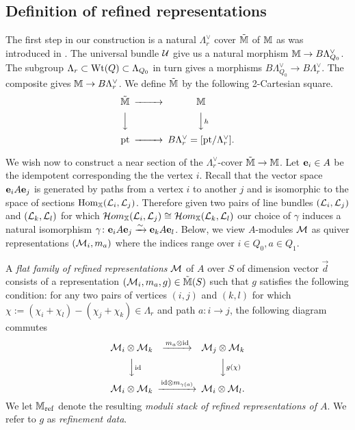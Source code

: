 \documentclass[12pt]{amsart}
\newcommand{\Wt}{\textup{Wt}}
\begin{document}
\subsection{Definition of refined representations}
The first step in our construction is a natural $\Lambda_r^\vee$ cover $\tilde{\mathbb{M}}$ of $\mathbb{M}$ as was introduced in \cite{Abd}.
The universal bundle $\mathcal{U}$ give us a natural morphism $\mathbb{M} \rightarrow B\Lambda_{Q_0}^\vee$.
The subgroup $\Lambda_r \subset \Wt(Q) \subset \Lambda_{Q_0}$ in turn gives a morphisms $B\Lambda_{Q_0}^\vee \rightarrow B\Lambda_r^\vee$.
The composite gives $\mathbb{M} \rightarrow B\Lambda_r^\vee$.
We define $\tilde{\mathbb{M}}$ by the following 2-Cartesian square.
\begin{equation*}
\begin{CD}
\tilde{\bM} @>>> \bM \\
@VVV @VVhV \\
\text{pt} @>>> B\Lambda_r^{\vee} = [\text{pt}/\Lambda_r^{\vee}].
\end{CD}
\end{equation*}

We wish now to construct a near section of the $\Lambda_r^{\vee}$-cover $\tilde{\mathbb{M}} \rightarrow \mathbb{M}$. 
Let $\mathbf{e}_i \in A$ be the idempotent corresponding the the vertex $i$. 
Recall that the vector space $\mathbf{e}_i A \mathbf{e}_j$ is generated by paths from a vertex $i$ to another $j$ and is isomorphic to the space of sections $\operatorname{Hom}_{\mathbb{X}} (\mathcal{L}_i, \mathcal{L}_j)$. 
Therefore given two pairs of line bundles $(\mathcal{L}_i, \mathcal{L}_j)$ and $(\mathcal{L}_k, \mathcal{L}_l)$ for which $\mathop{{\mathcal{H}}om}\nolimits_{\mathbb{X}}(\mathcal{L}_i, \mathcal{L}_j) \cong \mathop{{\mathcal{H}}om}\nolimits_{\mathbb{X}}(\mathcal{L}_k, \mathcal{L}_l)$ our choice of $\gamma$ induces a natural  isomorphism $\gamma \colon \mathbf{e}_i A \mathbf{e}_j \xrightarrow{\sim} \mathbf{e}_k A \mathbf{e}_l$.
Below, we view $A$-modules $\mathcal{M}$ as quiver representations $(\mathcal{M}_i,m_a)$ where the indices range over $i \in Q_0, a \in Q_1$. 

\begin{definition} \label{def:refined}
A {\em flat family of refined representations} $\mathcal{M}$ of $A$ over $S$ of dimension vector $\vec{d}$ consists of a representation $(\mathcal{M}_i, m_a, g) \in \tilde{\mathbb{M}}(S)$ such that $g$ satisfies the following condition: for any two pairs of vertices $(i,j)$ and $(k,l)$ for which $\chi:= (\chi_i + \chi_l)-(\chi_j + \chi_k) \in \Lambda_r$ and path $a \colon i \rightarrow j$, the following diagram commutes
\begin{equation}  \label{eqn:refined}
\begin{CD}
\cM_i \otimes \cM_k @>m_a \otimes \text{id}>> \cM_j \otimes \cM_k\\
@VV\text{id}V @VVg(\chi)V\\
\cM_i \otimes \cM_k @>\text{id} \otimes m_{\gamma(a)}>> \cM_i \otimes \cM_l.
\end{CD}
\end{equation}
We let $\mathbb{M}_{\text{ref}}$ denote the resulting {\em moduli stack of refined representations of $A$}. We refer to $g$ as {\em refinement data}. 
\end{definition}
\end{document}
